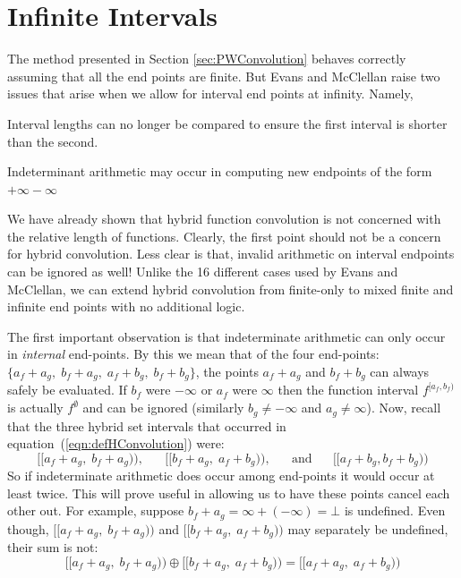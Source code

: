 %
%
\section{Infinite Intervals}\label{sec:ConvInfty}


The method presented in Section \ref{sec:PWConvolution} behaves correctly assuming that all the end points are finite.
But Evans and McClellan \cite{evans1994algorithms} raise two issues that arise when we allow for interval end points at
infinity. Namely,
\begin{enumerate*}
	\item Interval lengths can no longer be compared to ensure the first interval is shorter than the second.
	\item Indeterminant arithmetic may occur in computing new endpoints of the form $+\infty-\infty$
\end{enumerate*}


We have already shown that hybrid function convolution is not concerned with the relative length of functions. 
Clearly, the first point should not be a concern for hybrid convolution.
Less clear is that, invalid arithmetic on interval endpoints can be ignored as well!
Unlike the 16 different cases used by Evans and McClellan, we can extend hybrid convolution from finite-only to mixed
finite and infinite end points with no additional logic.


The first important observation is that indeterminate arithmetic can only occur in \emph{internal} end-points.
By this we mean that of the four end-points: $\{ a_f+a_g, \; b_f+a_g, \; a_f+b_g, \; b_f+b_g \}$, the points $a_f+a_g$
and $b_f+b_g$ can always safely be evaluated.
If $b_f$ were $-\infty$ or $a_f$ were $\infty$ then the function interval $f^{[a_f,b_f)}$ is actually $f^\emptyset$ and
can be ignored (similarly $b_g \neq -\infty$ and $a_g \neq \infty$).
Now, recall that the three hybrid set intervals that occurred in equation~(\ref{eqn:defHConvolution}) were:
\begin{equation*}
	[\![a_f+a_g, \; b_f+a_g)\!), 
	\;\;\;\;\;\; [\![b_f+a_g, \; a_f+b_g )\!), 
	\;\;\;\;\;\; \text{and} 
	\;\;\;\;\;\; [\![a_f+b_g, b_f+b_g)\!)
\end{equation*}
So if indeterminate arithmetic does occur among end-points it would occur at least twice.
This will prove useful in allowing us to have these points cancel each other out.
For example, suppose $b_f+a_g = \infty+(-\infty) =\bot$ is undefined.
Even though, $[\![a_f+a_g, \; b_f+a_g)\!)$ and ${[\![b_f+a_g, \; a_f+b_g )\!)}$ may separately be undefined, 
their sum is not:
\begin{equation*}
	[\![a_f+a_g, \; b_f+a_g)\!) \oplus [\![b_f+a_g, \; a_f+b_g )\!) = [\![a_f+a_g, \;a_f+b_g)\!)
\end{equation*}


